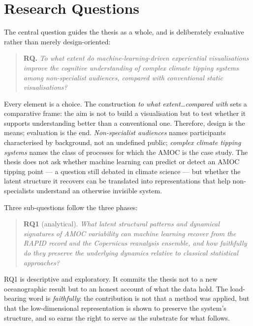 \section{Research Questions}
\label{sec:rqs}

The central question guides the thesis as a whole, and is deliberately evaluative rather than merely design-oriented:

\begin{quote}
\textbf{RQ.} \emph{To what extent do machine-learning-driven experiential visualisations improve the cognitive understanding of complex climate tipping systems among non-specialist audiences, compared with conventional static visualisations?}
\end{quote}

Every element is a choice. The construction \emph{to what extent\ldots compared with} sets a comparative frame: the aim is not to build a visualisation but to test whether it supports understanding better than a conventional one. Therefore, design is the means; evaluation is the end. \emph{Non-specialist audiences} names participants characterised by background, not an undefined public; \emph{complex climate tipping systems} names the class of processes for which the AMOC is the case study. The thesis does not ask whether machine learning can predict or detect an AMOC tipping point --- a question still debated in climate science \citep{benyami2024, ditlevsen2023} --- but whether the latent structure it recovers can be translated into representations that help non-specialists understand an otherwise invisible system.

Three sub-questions follow the three phases:

\begin{quote}
\textbf{RQ1} (analytical). \emph{What latent structural patterns and dynamical signatures of AMOC variability can machine learning recover from the RAPID record and the Copernicus reanalysis ensemble, and how faithfully do they preserve the underlying dynamics relative to classical statistical approaches?}
\end{quote}

RQ1 is descriptive and exploratory. It commits the thesis not to a new oceanographic result but to an honest account of what the data hold. The load-bearing word is \emph{faithfully}: the contribution is not that a method was applied, but that the low-dimensional representation is shown to preserve the system's structure, and so earns the right to serve as the substrate for what follows.

